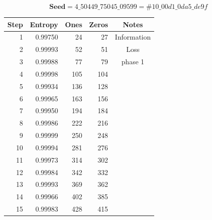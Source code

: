 \documentclass[letterpaper]{article}
\begin{document}
\begin{multicols}{2}
    \noindent
    \begin{minipage}{\columnwidth}
        \setlength{\tabcolsep}{.35\tabcolsep}
        \centering
        $$\textbf{Seed} = 4\_50449\_75045\_09599 = \#10\_00d1\_0da5\_de9f$$
        \begin{tabular}{|r|r|r|r|c|}
            \hline
            \textbf{Step} & \textbf{Entropy} & \textbf{Ones} & \textbf{Zeros} & \textbf{Notes} \\
            \hline
            1                  & 0.99750          & 24            & 27             & Information    \\
            2                  & 0.99993          & 52            & 51             & Loss           \\
            3                  & 0.99988          & 77            & 79             & phase 1        \\
            4                  & 0.99998          & 105           & 104            &                \\
            5                  & 0.99934          & 136           & 128            &                \\
            6                  & 0.99965          & 163           & 156            &                \\
            7                  & 0.99950          & 194           & 184            &                \\
            8                  & 0.99986          & 222           & 216            &                \\
            9                  & 0.99999          & 250           & 248            &                \\
            10                 & 0.99994          & 281           & 276            &                \\
            11                 & 0.99973          & 314           & 302            &                \\
            12                 & 0.99984          & 342           & 332            &                \\
            13                 & 0.99993          & 369           & 362            &                \\
            14                 & 0.99966          & 402           & 385            &                \\
            15                 & 0.99983          & 428           & 415            &                \\

\end{tabular}
\end{minipage}
\end{multicols}
\end{document}
